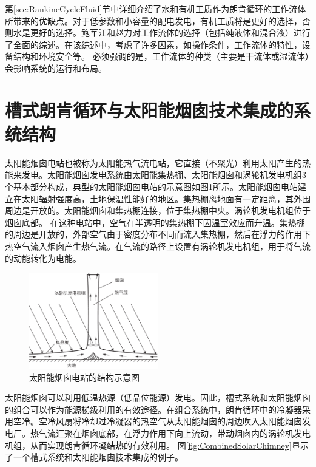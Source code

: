 第\ref{sec:RankineCycleFluid}节中详细介绍了水和有机工质作为朗肯循环的工作流体所带来的优缺点。对于低参数和小容量的配电发电，有机工质将是更好的选择，否则水是更好的选择。鲍军江和赵力\cite{Bao2013}对工作流体的选择（包括纯液体和混合液）进行了全面的综述。在该综述中，考虑了许多因素，如操作条件，工作流体的特性，设备结构和环境安全等。
必须强调的是，工作流体的种类（主要是干流体或湿流体）会影响系统的运行和布局。

\section{槽式朗肯循环与太阳能烟囱技术集成的系统结构}
\label{sec:sc}

太阳能烟囱电站也被称为太阳能热气流电站，它直接（不聚光）利用太阳产生的热能来发电。太阳能烟囱发电系统由太阳能集热棚、太阳能烟囱和涡轮机发电机组3个基本部分构成，典型的太阳能烟囱电站的示意图如图\ref{fig:SolarChimney}所示。太阳能烟囱电站建立在太阳辐射强度高，土地保温性能好的地区。集热棚离地面有一定距离，其外围周边是开放的。太阳能烟囱和集热棚连接，位于集热棚中央。涡轮机发电机组位于烟囱底部。
在这种电站中，空气在半透明的集热棚下因温室效应而升温。集热棚的周边是开放的，外部空气由于密度分布不同而流入集热棚，然后在浮力的作用下热空气流入烟囱产生热气流。在气流的路径上设置有涡轮机发电机组，用于将气流的动能转化为电能。

\begin{figure}[!ht]
\centering 
\includegraphics[width=0.5\textwidth]{fig/SolarChimney}
\caption{太阳能烟囱电站的结构示意图}\label{fig:SolarChimney}
\end{figure}

太阳能烟囱可以利用低温热源（低品位能源）发电。因此，槽式系统和太阳能烟囱的组合可以作为能源梯级利用的有效途径。在组合系统中，朗肯循环中的冷凝器采用空冷。空冷风扇将冷却过冷凝器的热空气从太阳能烟囱的周边吹入太阳能烟囱发电厂。热气流汇聚在烟囱底部，在浮力作用下向上流动，带动烟囱内的涡轮机发电机组，从而实现朗肯循环凝结热的有效利用。
图\ref{fig:CombinedSolarChimney}显示了一个槽式系统和太阳能烟囱技术集成的例子。

